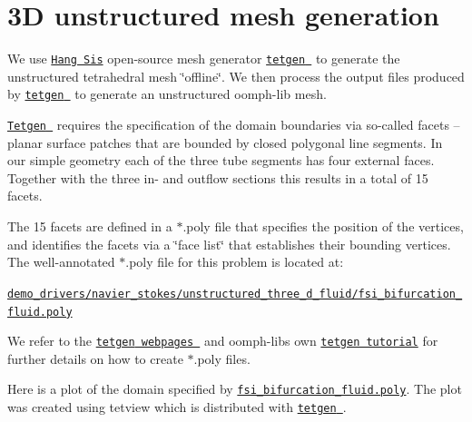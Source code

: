  

\hypertarget{index_mesh}{}\section{3\+D unstructured mesh generation}\label{index_mesh}
We use \href{http://www.wias-berlin.de/~si }{\tt Hang Si\textquotesingle{}s} open-\/source mesh generator \href{http://wias-berlin.de/software/tetgen//}{\tt {\ttfamily tetgen} } to generate the unstructured tetrahedral mesh \char`\"{}offline\char`\"{}. We then process the output files produced by \href{http://wias-berlin.de/software/tetgen//}{\tt {\ttfamily tetgen} } to generate an unstructured {\ttfamily oomph-\/lib} mesh.

\href{http://wias-berlin.de/software/tetgen//}{\tt {\ttfamily Tetgen} } requires the specification of the domain boundaries via so-\/called facets -- planar surface patches that are bounded by closed polygonal line segments. In our simple geometry each of the three tube segments has four external faces. Together with the three in-\/ and outflow sections this results in a total of 15 facets.

The 15 facets are defined in a {\ttfamily $\ast$.poly} file that specifies the position of the vertices, and identifies the facets via a \char`\"{}face list\char`\"{} that establishes their bounding vertices. The well-\/annotated {\ttfamily $\ast$.poly} file for this problem is located at\+:

\begin{center} \href{../../../../demo_drivers/navier_stokes/unstructured_three_d_fluid/fsi_bifurcation_fluid.poly}{\tt demo\+\_\+drivers/navier\+\_\+stokes/unstructured\+\_\+three\+\_\+d\+\_\+fluid/fsi\+\_\+bifurcation\+\_\+fluid.\+poly} \end{center} 

We refer to the \href{http://wias-berlin.de/software/tetgen//}{\tt {\ttfamily tetgen} webpages } and {\ttfamily oomph-\/lib\textquotesingle{}s} own \href{../../../meshes/mesh_from_tetgen/html/index.html}{\tt tetgen tutorial} for further details on how to create {\ttfamily $\ast$.poly} files.

Here is a plot of the domain specified by \href{../../../../demo_drivers/navier_stokes/unstructured_three_d_fluid/fsi_bifurcation_fluid.poly}{\tt fsi\+\_\+bifurcation\+\_\+fluid.\+poly}. The plot was created using {\ttfamily tetview} which is distributed with \href{http://wias-berlin.de/software/tetgen//}{\tt {\ttfamily tetgen} }.

